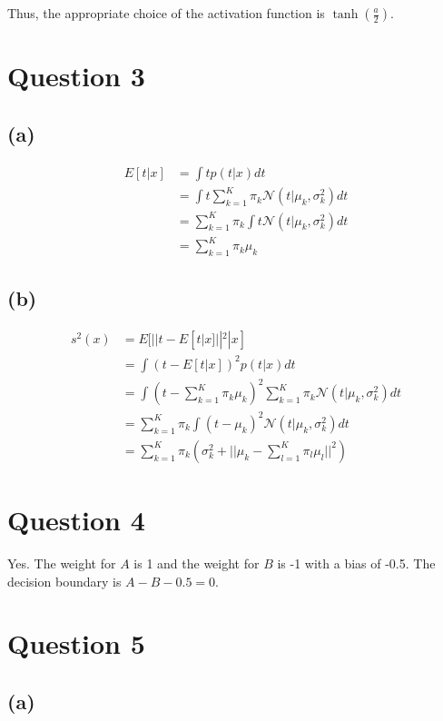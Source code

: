 \documentclass[a4paper,12pt]{article}
\begin{document}
Thus, the appropriate choice of the activation function is $\tanh(\frac{a}{2})$.

\section*{Question 3}

\subsection*{(a)}

\begin{align*}
	E[t|x] &= \int t p(t|x) dt \\
	&= \int t \sum_{k=1}^{K} \pi_k \mathcal{N}(t|\mu_k,\sigma_k^2) dt \\
	&= \sum_{k=1}^{K} \pi_k \int t \mathcal{N}(t|\mu_k,\sigma_k^2) dt \\
	&= \sum_{k=1}^{K} \pi_k \mu_k
\end{align*}

\subsection*{(b)}

\begin{align*}
	s^2(x) &= E[||t - E[t|x]||^2|x] \\
	&= \int (t - E[t|x])^2 p(t|x) dt \\
	&= \int (t - \sum_{k=1}^{K} \pi_k \mu_k)^2 \sum_{k=1}^{K} \pi_k \mathcal{N}(t|\mu_k,\sigma_k^2) dt \\
	&= \sum_{k=1}^{K} \pi_k \int (t - \mu_k)^2 \mathcal{N}(t|\mu_k,\sigma_k^2) dt \\
	&= \sum_{k=1}^{K} \pi_k (\sigma_k^2 + ||\mu_k - \sum_{l=1}^{K} \pi_l \mu_l||^2)
\end{align*}

\section*{Question 4}

Yes. The weight for $A$ is 1 and the weight for $B$ is -1 with a bias of -0.5. The decision boundary is $A - B - 0.5 = 0$. 

\section*{Question 5}

\subsection*{(a)}
\end{document}
